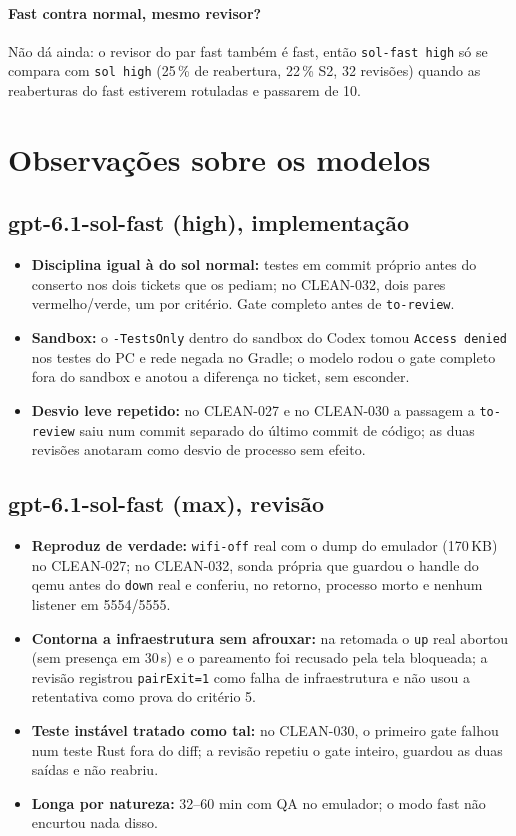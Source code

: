 \documentclass[11pt,a4paper]{article}
\begin{document}
\paragraph{Fast contra normal, mesmo revisor?} Não dá ainda: o revisor do
par fast também é fast, então \texttt{sol-fast high} só se compara com
\texttt{sol high} (25\,\% de reabertura, 22\,\% S2, 32 revisões) quando as
reaberturas do fast estiverem rotuladas e passarem de 10.

\section{Observações sobre os modelos}

\subsection*{gpt-6.1-sol-fast (high), implementação}
\begin{itemize}
  \item \textbf{Disciplina igual à do sol normal:} testes em commit próprio
        antes do conserto nos dois tickets que os pediam; no CLEAN-032, dois
        pares vermelho/verde, um por critério. Gate completo antes de
        \texttt{to-review}.
  \item \textbf{Sandbox:} o \texttt{-TestsOnly} dentro do sandbox do Codex
        tomou \texttt{Access denied} nos testes do PC e rede negada no Gradle;
        o modelo rodou o gate completo fora do sandbox e anotou a diferença no
        ticket, sem esconder.
  \item \textbf{Desvio leve repetido:} no CLEAN-027 e no CLEAN-030 a passagem a
        \texttt{to-review} saiu num commit separado do último commit de
        código; as duas revisões anotaram como desvio de processo sem efeito.
\end{itemize}

\subsection*{gpt-6.1-sol-fast (max), revisão}
\begin{itemize}
  \item \textbf{Reproduz de verdade:} \texttt{wifi-off} real com o dump do
        emulador (170\,KB) no CLEAN-027; no CLEAN-032, sonda própria que
        guardou o handle do qemu antes do \texttt{down} real e conferiu, no
        retorno, processo morto e nenhum listener em 5554/5555.
  \item \textbf{Contorna a infraestrutura sem afrouxar:} na retomada o
        \texttt{up} real abortou (sem presença em 30\,s) e o pareamento foi
        recusado pela tela bloqueada; a revisão registrou
        \texttt{pairExit=1} como falha de infraestrutura e não usou a
        retentativa como prova do critério 5.
  \item \textbf{Teste instável tratado como tal:} no CLEAN-030, o primeiro
        gate falhou num teste Rust fora do diff; a revisão repetiu o gate
        inteiro, guardou as duas saídas e não reabriu.
  \item \textbf{Longa por natureza:} 32--60 min com QA no emulador; o
        modo fast não encurtou nada disso.
\end{itemize}
\end{document}

